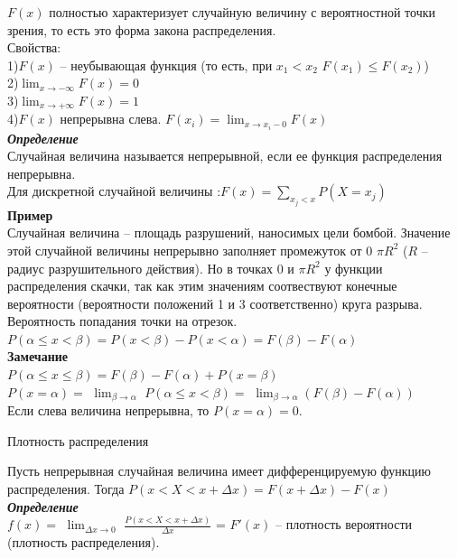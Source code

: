 \documentclass[russian, 12pt, fleqn]{article}
\begin{document}
$F(x)$ полностью характеризует случайную величину с вероятностной точки зрения, то есть это форма закона распределения.\\
Свойства:\\
1)$F(x)$ -- неубывающая функция (то есть, при $x_1 < x_2$ $F(x_1) \leq F(x_2)$)\\
2)$\displaystyle{  \lim_{x\to{-\infty}}  } F(x) = 0$\\
3)$\displaystyle{  \lim_{x\to{+\infty}}  } F(x)  = 1$\\
4)$F(x)$ непрерывна слева. $\displaystyle{ F(x_i) = \lim_{x\to{x_i - 0}} F(x) }$ \\
\textit{\textbf{Определение}}\\
Случайная величина называется непрерывной, если ее функция распределения непрерывна.\\
Для дискретной случайной величины :$F(x) = \sum\limits_{x_j < x}P(X=x_j)$\\
\textbf{Пример\ }\\
Случайная величина -- площадь разрушений, наносимых цели  бомбой. Значение этой случайной величины непрерывно заполняет промежуток от $0$ $\pi R^2$ ($R$ -- радиус разрушительного действия). Но в точках $0$ и $\pi R^2$ у функции распределения скачки, так как этим значениям соотвествуют конечные вероятности (вероятности положений 1 и 3 соответственно) круга разрыва.\\
Вероятность попадания точки на отрезок.\\
$P(\alpha \leq  x <  \beta) = P(x < \beta) - P(x < \alpha) = F(\beta) - F(\alpha)$\\
\textbf{Замечание\ } \\
$P(\alpha \leq  x \leq  \beta) = F(\beta) - F(\alpha) + P(x = \beta)$\\
$P(x = \alpha)=$   $\displaystyle{  \lim_{\beta \to{\alpha}}} $           $ P(\alpha \leq x < \beta) =$    $\displaystyle { \lim_{\beta \to {\alpha}}} (F(\beta) - F(\alpha))$\\
Если слева величина непрерывна, то $P(x=\alpha)=0$.\\
\begin{center}
$\textbf{Плотность распределения }$\\
\end{center}
Пусть непрерывная случайная величина имеет дифференцируемую функцию распределения. Тогда $P(x<X<x + \Delta x) =  F(x + \Delta x) - F(x)$\\
\textit{\textbf{Определение}}\\ $f(x) =$ $\displaystyle { \lim_{{\Delta x} \to {0}}}$ $\frac{P(x<X<x+\Delta x)}{\Delta x}$ = $F'(x)$ -- плотность вероятности (плотность распределения).\\
\end{document}
